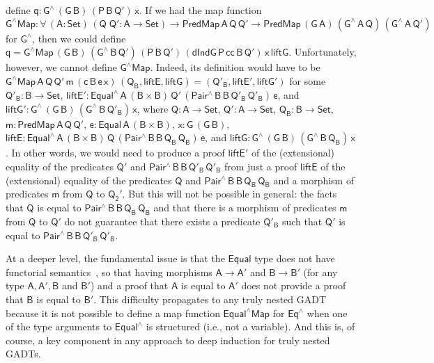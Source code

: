 \documentclass[9pt]{entcs}
\begin{document}
define $\mathsf{q : G^{\wedge}\,(G\,B)\,(P\,B\,Q')\,x}$.  If we had
the map function $\mathsf{G^\wedge Map : \forall\, (A : Set)\, (Q\;Q'
  : A \to Set) \to PredMap\,A\,Q\,Q' \to
  PredMap\,(G\,A)\,(G^{\wedge}\,A\,Q)\,(G^{\wedge}\,A\,Q')}$ for
$\mathsf{G^{\wedge}}$, then we could define $\mathsf{q = G^\wedge
  Map\,(G\,B)\,(G^{\wedge}\,B\,Q')\,(P\,B\,Q')\,
  (dIndG\,P\,cc\,B\,Q')\,x\,liftG}$.  Unfortunately, however, we
cannot define $\mathsf{G^\wedge Map}$. Indeed, its definition would
have to be $ \mathsf{G^\wedge Map\,A\,Q\,Q'\,m\,(c\,B\,e\,x)\,(Q_B,
  liftE, liftG) = (Q'_B, liftE', liftG')}$ for some $\mathsf{Q'_B : B
  \to Set}$, $\mathsf{liftE' : Equal^{\wedge}\,A\,(B \times
  B)\,Q'\,(Pair^{\wedge}\,B\,B\,Q'_B\,Q'_B)\,e}$, and $\mathsf{liftG'
  : G^{\wedge}\,(G\,B)\,(G^{\wedge}\,B\,Q'_B)\,x}$, where $\mathsf{Q :
  A \to Set}$, $\mathsf{Q' : A \to Set}$, $\mathsf{Q_B : B \to Set}$,
$\mathsf{m : PredMap\,A\,Q\,Q'}$, $\mathsf{e : Equal\,A\,(B \times
  B)}$, $\mathsf{x : G\,(G\,B)}$, $\mathsf{liftE :
  Equal^{\wedge}\,A\,(B \times
  B)\,Q\,(Pair^{\wedge}\,B\,B\,Q_B\,Q_B)\,e}$, and $\mathsf{liftG :
  G^{\wedge}\,(G\,B)\,(G^{\wedge}\,B\,Q_B)\,x}$. In other words, we
would need to produce a proof $\mathsf{liftE'}$ of the (extensional)
equality of the predicates $\mathsf{Q'}$ and
$\mathsf{Pair^{\wedge}\,B\,B\,Q'_B\,Q'_B}$ from just a proof
$\mathsf{liftE}$ of the (extensional) equality of the predicates
$\mathsf{Q}$ and $\mathsf{Pair^{\wedge}\,B\,B\,Q_B\,Q_B}$ and a
morphism of predicates $\mathsf{m}$ from $\mathsf{Q}$ to
$\mathsf{Q_2'}$.
But this will not be possible in general: the facts that $\mathsf{Q}$
is equal to $\mathsf{Pair^{\wedge}\,B\,B\,Q_B\,Q_B}$ and that there is
a morphism of predicates $\mathsf{m}$ from $\mathsf{Q}$ to
$\mathsf{Q'}$ do not guarantee that there exists a predicate
$\mathsf{Q'_B}$ such that $\mathsf{Q'}$ is equal to
$\mathsf{Pair^{\wedge}\,B\,B\,Q'_B\,Q'_B}$.

At a deeper level, the fundamental issue is that the $\mathsf{Equal}$
type does not have functorial semantics~\cite{jgj21}, so that having
morphisms $\mathsf{A \to A'}$ and $\mathsf{B \to B'}$ (for any type
$\mathsf{A, A', B}$ and $\mathsf{B'}$) and a proof that $\mathsf{A}$
is equal to $\mathsf{A'}$ does not provide a proof that $\mathsf{B}$
is equal to $\mathsf{B'}$. This difficulty propagates to any truly
nested GADT because it is not possible to define a map function
$\mathsf{Equal^\wedge Map}$ for $\mathsf{Eq^\wedge}$ when one of the
type arguments to $\mathsf{Equal^\wedge}$ is structured (i.e., not a
variable). And this is, of course, a key component in any approach to
deep induction for truly nested GADTs.
\end{document}
